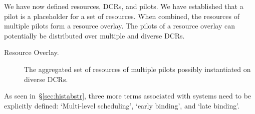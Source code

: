 \documentclass{sig-alternate}
\begin{document}



We have now defined resources, DCRs, and pilots. We have established that a
pilot is a placeholder for a set of resources. When combined, the resources of
multiple pilots form a resource overlay. The pilots of a resource overlay can
potentially be distributed over multiple and diverse DCRs.



\begin{description}
\item[Resource Overlay.] The aggregated set of resources of multiple pilots possibly instantiated on diverse DCRs.
\end{description}

As seen in~\S\ref{sec:histabstr}, three more terms associated with \pilot
systems need to be explicitly defined: `Multi-level scheduling', `early
binding', and `late binding'.


\end{document}
